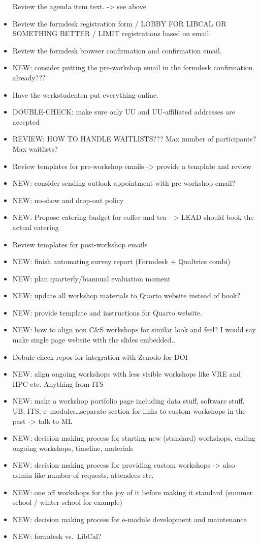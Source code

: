 \documentclass[
  letterpaper,
  DIV=11,
  numbers=noendperiod]{scrreprt}
\begin{document}
\begin{itemize}
  Review the agenda item text. -\textgreater{} see above
\item
  Review the formdesk registration form / LOBBY FOR LIBCAL OR SOMETHING
  BETTER / LIMIT registrations based on email
\item
  Review the formdesk browser confirmation and confirmation email.
\item
  NEW: consider putting the pre-workshop email in the formdesk
  confirmation already???
\item
  Have the werkstudenten put everything online.
\item
  DOUBLE-CHECK: make sure only UU and UU-affiliated addresses are
  accepted
\item
  REVIEW: HOW TO HANDLE WAITLISTS??? Max number of participants? Max
  waitlists?
\item
  Review templates for pre-workshop emails -\textgreater{} provide a
  template and review
\item
  NEW: consider sending outlook appointment with pre-workshop email?
\item
  NEW: no-show and drop-out policy
\item
  NEW: Propose catering budget for coffee and tea - \textgreater{} LEAD
  should book the actual catering
\item
  Review templates for post-workshop emails
\item
  NEW: finish automating survey report (Formdesk + Qualtrics combi)
\item
  NEW: plan quarterly/biannual evaluation moment
\item
  NEW: update all workshop materials to Quarto website instead of book?
\item
  NEW: provide template and instructions for Quarto website.
\item
  NEW: how to align non C\&S workshops for similar look and feel? I
  would say make single page website with the slides embedded..
\item
  Dobule-check repos for integration with Zenodo for DOI
\item
  NEW: align ongoing workshops with less visible workshops like VRE and
  HPC etc. Anything from ITS
\item
  NEW: make a workshop portfolio page including data stuff, software
  stuff, UB, ITS, e--modules\ldots separate section for links to custom
  workshops in the past -\textgreater{} talk to ML
\item
  NEW: decision making process for starting new (standard) workshops,
  ending ongoing workshops, timeline, materials
\item
  NEW: decision making process for providing custom workshops
  -\textgreater{} also admin like number of requests, attendees etc.
\item
  NEW: one off workshops for the joy of it before making it standard
  (summer school / winter school for example)
\item
  NEW: decision making process for e-module development and maintenance
\item
  NEW: formdesk vs.~LibCal?
\end{itemize}
\end{document}
